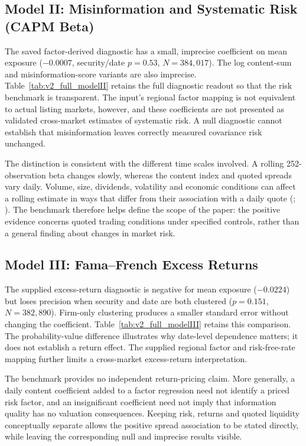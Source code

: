 \documentclass{article}
\theoremstyle{plain}
\begin{document}
\subsection{Model II: Misinformation and Systematic Risk (CAPM Beta)}
\label{sec:results_modelII}
The saved factor-derived diagnostic has a small, imprecise coefficient on mean exposure ($-0.0007$, security/date $p=0.53$, $N=384{,}017$). The log content-sum and misinformation-score variants are also imprecise. Table~\ref{tab:v2_full_modelII} retains the full diagnostic readout so that the risk benchmark is transparent. The input's regional factor mapping is not equivalent to actual listing markets, however, and these coefficients are not presented as validated cross-market estimates of systematic risk. A null diagnostic cannot establish that misinformation leaves correctly measured covariance risk unchanged.



The distinction is consistent with the different time scales involved. A rolling 252-observation beta changes slowly, whereas the content index and quoted spreads vary daily. Volume, size, dividends, volatility and economic conditions can affect a rolling estimate in ways that differ from their association with a daily quote (\cite{StockWatson2002}; \cite{BakerBloomDavis2016}). The benchmark therefore helps define the scope of the paper: the positive evidence concerns quoted trading conditions under specified controls, rather than a general finding about changes in market risk.

\subsection{Model III: Fama--French Excess Returns}
\label{sec:results_modelIII}
The supplied excess-return diagnostic is negative for mean exposure ($-0.0224$) but loses precision when security and date are both clustered ($p=0.151$, $N=382{,}890$). Firm-only clustering produces a smaller standard error without changing the coefficient. Table~\ref{tab:v2_full_modelIII} retains this comparison. The probability-value difference illustrates why date-level dependence matters; it does not establish a return effect. The supplied regional factor and risk-free-rate mapping further limits a cross-market excess-return interpretation.



The benchmark provides no independent return-pricing claim. More generally, a daily content coefficient added to a factor regression need not identify a priced risk factor, and an insignificant coefficient need not imply that information quality has no valuation consequences. Keeping risk, returns and quoted liquidity conceptually separate allows the positive spread association to be stated directly, while leaving the corresponding null and imprecise results visible.
\end{document}
